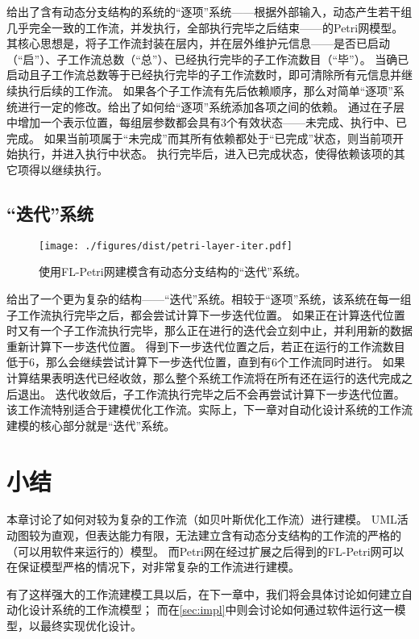 \documentclass[index]{subfiles}
\begin{document}
给出了含有动态分支结构的系统的“逐项”系统——根据外部输入，动态产生若干组几乎完全一致的工作流，并发执行，全部执行完毕之后结束——的Petri网模型。
其核心思想是，将子工作流封装在层内，并在层外维护元信息——是否已启动（“启”）、子工作流总数（“总”）、已经执行完毕的子工作流数目（“毕”）。
当确已启动且子工作流总数等于已经执行完毕的子工作流数时，即可清除所有元信息并继续执行后续的工作流。
如果各个子工作流有先后依赖顺序，那么对简单“逐项”系统进行一定的修改。给出了如何给“逐项”系统添加各项之间的依赖。
通过在子层中增加一个表示位置，每组层参数都会具有3个有效状态——未完成、执行中、已完成。
如果当前项属于“未完成”而其所有依赖都处于“已完成”状态，则当前项开始执行，并进入执行中状态。
执行完毕后，进入已完成状态，使得依赖该项的其它项得以继续执行。

\subsection{“迭代”系统}
\begin{figure}[h]
  \centering
  \texttt{[image: ./figures/dist/petri-layer-iter.pdf]}
  \caption[FL-Petri建模“迭代”系统]{使用FL-Petri网建模含有动态分支结构的“迭代”系统。\label{fig:petri-layer-iter}}
\end{figure}

给出了一个更为复杂的结构——“迭代”系统。相较于“逐项”系统，该系统在每一组子工作流执行完毕之后，都会尝试计算下一步迭代位置。
如果正在计算迭代位置时又有一个子工作流执行完毕，那么正在进行的迭代会立刻中止，并利用新的数据重新计算下一步迭代位置。
得到下一步迭代位置之后，若正在运行的工作流数目低于6，那么会继续尝试计算下一步迭代位置，直到有6个工作流同时进行。
如果计算结果表明迭代已经收敛，那么整个系统工作流将在所有还在运行的迭代完成之后退出。
迭代收敛后，子工作流执行完毕之后不会再尝试计算下一步迭代位置。
该工作流特别适合于建模优化工作流。实际上，下一章对自动化设计系统的工作流建模的核心部分就是“迭代”系统。

\section{小结}
本章讨论了如何对较为复杂的工作流（如贝叶斯优化工作流）进行建模。
UML活动图较为直观，但表达能力有限，无法建立含有动态分支结构的工作流的严格的（可以用软件来运行的）模型。
而Petri网在经过扩展之后得到的FL-Petri网可以在保证模型严格的情况下，对非常复杂的工作流进行建模。

有了这样强大的工作流建模工具以后，在下一章中，我们将会具体讨论如何建立自动化设计系统的工作流模型；
而在\cref{sec:impl}中则会讨论如何通过软件运行这一模型，以最终实现优化设计。
\end{document}
